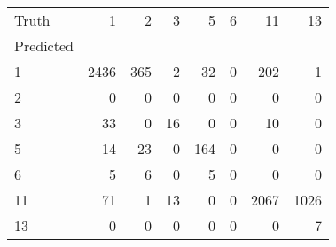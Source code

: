 \begin{tabular}{lrrrrrrr}
\toprule
Truth & 1 & 2 & 3 & 5 & 6 & 11 & 13 \\
Predicted &  &  &  &  &  &  &  \\
\midrule
1 & 2436 & 365 & 2 & 32 & 0 & 202 & 1 \\
2 & 0 & 0 & 0 & 0 & 0 & 0 & 0 \\
3 & 33 & 0 & 16 & 0 & 0 & 10 & 0 \\
5 & 14 & 23 & 0 & 164 & 0 & 0 & 0 \\
6 & 5 & 6 & 0 & 5 & 0 & 0 & 0 \\
11 & 71 & 1 & 13 & 0 & 0 & 2067 & 1026 \\
13 & 0 & 0 & 0 & 0 & 0 & 0 & 7 \\
\bottomrule
\end{tabular}
